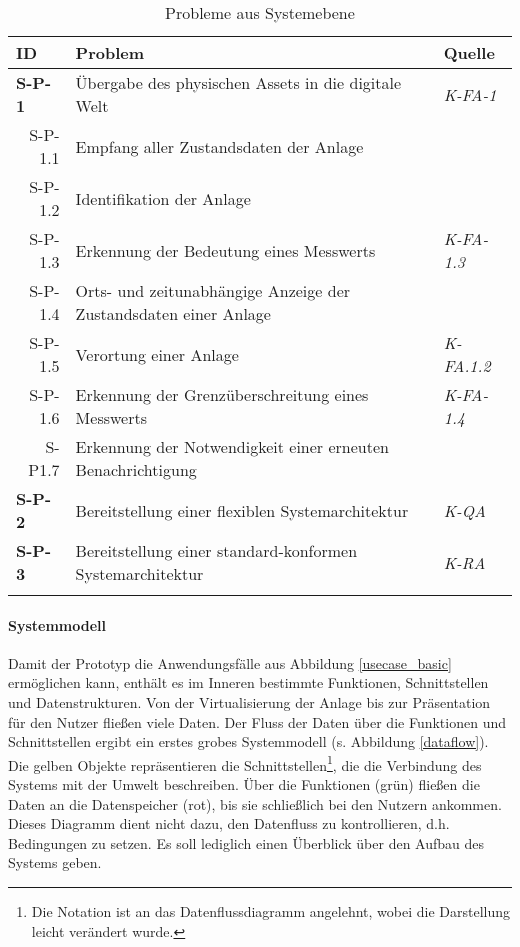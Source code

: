 \begin{table}[ht!]
  \begin{tabularx}{\textwidth}{@{}lXp{2cm}@{}}
      \toprule
      ID                & Problem & Quelle \\
      \midrule
      \textbf{S-P-1}              &       Übergabe des physischen Assets in die digitale Welt               & \textit{K-FA-1}                \\
      \multicolumn{1}{r}{S-P-1.1} &  Empfang aller Zustandsdaten der Anlage     \\
      \multicolumn{1}{r}{S-P-1.2} &  Identifikation der Anlage     \\
      \multicolumn{1}{r}{S-P-1.3} &  Erkennung der Bedeutung eines Messwerts  & \textit{K-FA-1.3}\\
      \multicolumn{1}{r}{S-P-1.4} &  Orts- und zeitunabhängige Anzeige der Zustandsdaten einer Anlage     \\
      \multicolumn{1}{r}{S-P-1.5} &  Verortung einer Anlage & \textit{K-FA.1.2}\\
      \multicolumn{1}{r}{S-P-1.6} &  Erkennung der Grenzüberschreitung eines Messwerts & \textit{K-FA-1.4}\\
      \multicolumn{1}{r}{S-P1.7} &  Erkennung der Notwendigkeit einer erneuten Benachrichtigung\\
      \textbf{S-P-2}              &  Bereitstellung einer flexiblen Systemarchitektur  & \textit{K-QA} \\
      \textbf{S-P-3}              &  Bereitstellung einer standard-konformen Systemarchitektur & \textit{K-RA} \\
      \addlinespace
      \bottomrule
  \end{tabularx}
  \label{system_probleme}
  \caption{Probleme aus Systemebene}

\end{table}


\paragraph{Systemmodell}

Damit der Prototyp die Anwendungsfälle aus Abbildung \ref{usecase_basic} ermöglichen kann, enthält es im Inneren bestimmte Funktionen, Schnittstellen und Datenstrukturen. Von der Virtualisierung der Anlage bis zur Präsentation für den Nutzer fließen viele Daten. Der Fluss der Daten über die Funktionen und Schnittstellen ergibt ein erstes grobes Systemmodell (s. Abbildung \ref{dataflow}). Die gelben Objekte repräsentieren die Schnittstellen\footnote{Die Notation ist an das Datenflussdiagramm angelehnt, wobei die Darstellung leicht verändert wurde.}, die die Verbindung des Systems mit der Umwelt beschreiben. Über die Funktionen (grün) fließen die Daten an die Datenspeicher (rot), bis sie schließlich bei den Nutzern ankommen. Dieses Diagramm dient nicht dazu, den Datenfluss zu kontrollieren, d.h. Bedingungen zu setzen. Es soll lediglich einen Überblick über den Aufbau des Systems geben.

